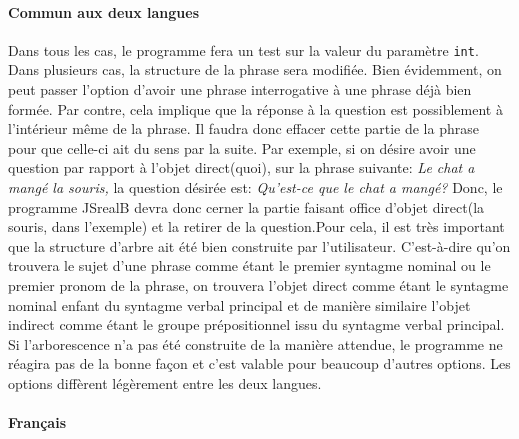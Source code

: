 \documentclass[11pt]{article} %
\newcommand{\system}[1]{\textsf{#1}}
\newcommand{\JSB}{\system{JSrealB}}
\begin{document}
\paragraph{Commun aux deux langues}

Dans tous les cas, le programme fera un test sur la valeur du paramètre
\texttt{int}. Dans plusieurs cas, la structure de la phrase sera modifiée.
Bien évidemment, on peut passer l'option d'avoir une phrase interrogative
à une phrase déjà bien formée. Par contre, cela implique que la réponse
à la question est possiblement à l'intérieur même de la phrase. Il
faudra donc effacer cette partie de la phrase pour que celle-ci ait
du sens par la suite. Par exemple, si on désire avoir une question
par rapport à l'objet direct(quoi), sur la phrase suivante: \emph{Le
chat a mangé la souris, }la question désirée est: \emph{Qu'est-ce
que le chat a mangé?} Donc, le programme \JSB{} devra donc cerner
la partie faisant office d'objet direct(la souris, dans l'exemple)
et la retirer de la question.Pour cela, il est très important que
la structure d'arbre ait été bien construite par l'utilisateur. C'est-à-dire
qu'on trouvera le sujet d'une phrase comme étant le premier syntagme
nominal ou le premier pronom de la phrase, on trouvera l'objet direct
comme étant le syntagme nominal enfant du syntagme verbal principal
et de manière similaire l'objet indirect comme étant le groupe prépositionnel
issu du syntagme verbal principal. Si l'arborescence n'a pas été construite
de la manière attendue, le programme ne réagira pas de la bonne façon
et c'est valable pour beaucoup d'autres options. Les options diffèrent
légèrement entre les deux langues.

\paragraph{Français}
\end{document}

